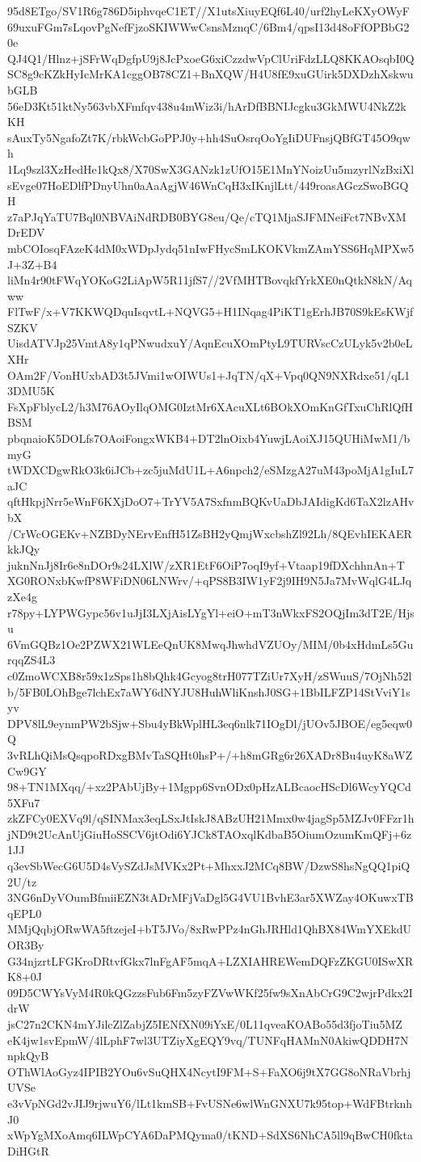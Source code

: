 95d8ETgo/SV1R6g786D5iphvqeC1ET//X1utsXiuyEQf6L40/urf2hyLeKXyOWyF
69uxuFGm7sLqovPgNefFjzoSKIWWwCsnsMznqC/6Bm4/qpsI13d48oFfOPBbG20e
QJ4Q1/Hlnz+jSFrWqDgfpU9j8JcPxoeG6xiCzzdwVpClUriFdzLLQ8KKAOsqbI0Q
SC8g9cKZkHyIcMrKA1cggOB78CZ1+BnXQW/H4U8fE9xuGUirk5DXDzhXskwubGLB
56eD3Kt51ktNy563vbXFmfqv438u4mWiz3i/hArDfBBNIJcgku3GkMWU4NkZ2kKH
sAuxTy5NgafoZt7K/rbkWcbGoPPJ0y+hh4SuOsrqOoYgIiDUFnsjQBfGT45O9qwh
1Lq9szl3XzHedHe1kQx8/X70SwX3GANzk1zUfO15E1MnYNoizUu5mzyrlNzBxiXl
sEvge07HoEDlfPDnyUhn0aAaAgjW46WnCqH3xIKnjlLtt/449roasAGczSwoBGQH
z7aPJqYaTU7Bql0NBVAiNdRDB0BYG8eu/Qe/cTQ1MjaSJFMNeiFct7NBvXMDrEDV
mbCOIosqFAzeK4dM0xWDpJydq51nIwFHycSmLKOKVkmZAmYSS6HqMPXw5J+3Z+B4
liMn4r90tFWqYOKoG2LiApW5R11jfS7//2VfMHTBovqkfYrkXE0nQtkN8kN/Aqww
FlTwF/x+V7KKWQDquIsqvtL+NQVG5+H1INqag4PiKT1gErhJB70S9kEsKWjfSZKV
UisdATVJp25VmtA8y1qPNwudxuY/AqnEcuXOmPtyL9TURVscCzULyk5v2b0eLXHr
OAm2F/VonHUxbAD3t5JVmi1wOIWUs1+JqTN/qX+Vpq0QN9NXRdxe51/qL13DMU5K
FsXpFblycL2/h3M76AOyIlqOMG0IztMr6XAcuXLt6BOkXOmKnGfTxuChRlQfHBSM
pbqnaioK5DOLfs7OAoiFongxWKB4+DT2lnOixb4YuwjLAoiXJ15QUHiMwM1/bmyG
tWDXCDgwRkO3k6iJCb+zc5juMdU1L+A6npch2/eSMzgA27uM43poMjA1gIuL7aJC
qftHkpjNrr5eWnF6KXjDoO7+TrYV5A7SxfnmBQKvUaDbJAIdigKd6TaX2lzAHvbX
/CrWcOGEKv+NZBDyNErvEnfH51ZsBH2yQmjWxcbshZl92Lh/8QEvhIEKAERkkJQy
juknNnJj8Ir6e8nDOr9s24LXlW/zXR1EtF6OiP7oqI9yf+Vtaap19fDXchhnAn+T
XG0RONxbKwfP8WFiDN06LNWrv/+qPS8B3IW1yF2j9IH9N5Ja7MvWqlG4LJqzXe4g
r78py+LYPWGypc56v1uJjI3LXjAisLYgYl+eiO+mT3nWkxFS2OQjIm3dT2E/Hjsu
6VmGQBz1Oe2PZWX21WLEeQnUK8MwqJhwhdVZUOy/MIM/0b4xHdmLs5GurqqZS4L3
c0ZmoWCXB8r59x1zSps1h8bQhk4Gcyog8trH077TZiUr7XyH/zSWuuS/7OjNh52l
b/5FB0LOhBge7lchEx7aWY6dNYJU8HuhWliKnshJ0SG+1BbILFZP14StVviY1syv
DPV8lL9eynmPW2bSjw+Sbu4yBkWplHL3eq6nlk71IOgDl/jUOv5JBOE/eg5eqw0Q
3vRLhQiMsQsqpoRDxgBMvTaSQHt0hsP+/+h8mGRg6r26XADr8Bu4uyK8aWZCw9GY
98+TN1MXqq/+xz2PAbUjBy+1Mgpp6SvnODx0pHzALBcaocHScDl6WcyYQCd5XFu7
zkZFCy0EXVq9l/qSINMax3eqLSxJtIskJ8ABzUH21Mmx0w4jagSp5MZJv0FFzr1h
jND9t2UcAnUjGiuHoSSCV6jtOdi6YJCk8TAOxqlKdbaB5OiumOzumKmQFj+6z1JJ
q3evSbWecG6U5D4sVySZdJsMVKx2Pt+MhxxJ2MCq8BW/DzwS8hsNgQQ1piQ2U/tz
3NG6nDyVOumBfmiiEZN3tADrMFjVaDgl5G4VU1BvhE3ar5XWZay4OKuwxTBqEPL0
MMjQqbjORwWA5ftzejeI+bT5JVo/8xRwPPz4nGhJRHld1QhBX84WmYXEkdUOR3By
G34njzrtLFGKroDRtvfGkx7lnFgAF5mqA+LZXIAHREWemDQFzZKGU0ISwXRK8+0J
09D5CWYsVyM4R0kQGzzsFub6Fm5zyFZVwWKf25fw9sXnAbCrG9C2wjrPdkx2IdrW
jsC27n2CKN4mYJilcZlZabjZ5IENfXN09iYxE/0L11qveaKOABo55d3fjoTiu5MZ
eK4jw1svEpmW/4lLphF7wl3UTZiyXgEQY9vq/TUNFqHAMnN0AkiwQDDH7NnpkQyB
OThWlAoGyz4IPIB2YOu6vSuQHX4NcytI9FM+S+FaXO6j9tX7GG8oNRaVbrhjUVSe
e3vVpNGd2vJIJ9rjwuY6/lLt1kmSB+FvUSNe6wlWnGNXU7k95top+WdFBtrknhJ0
xWpYgMXoAmq6ILWpCYA6DaPMQyma0/tKND+SdXS6NhCA5ll9qBwCH0fktaDiHGtR

